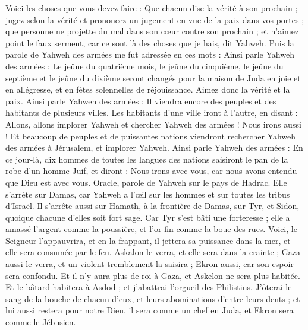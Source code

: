 \begin{multicols}{2}
Voici les choses que vous devez faire : Que chacun dise la vérité à son prochain ; jugez selon la vérité et prononcez un jugement en vue de la paix dans vos portes ;
que personne ne projette du mal dans son cœur contre son prochain ; et n'aimez point le faux serment, car ce sont là des choses que je hais, dit Yahweh.
Puis la parole de Yahweh des armées me fut adressée en ces mots :
Ainsi parle Yahweh des armées : Le jeûne du quatrième mois, le jeûne du cinquième, le jeûne du septième et le jeûne du dixième seront changés pour la maison de Juda en joie et en allégresse, et en fêtes solennelles de réjouissance. Aimez donc la vérité et la paix.
Ainsi parle Yahweh des armées : Il viendra encore des peuples et des habitants de plusieurs villes.
Les habitants d’une ville  iront à l'autre, en disant : Allons, allons implorer Yahweh et chercher Yahweh des armées ! Nous irons aussi !
Et beaucoup de peuples et de puissantes nations viendront rechercher Yahweh des armées à Jérusalem, et implorer Yahweh.
Ainsi parle Yahweh des armées : En ce jour-là, dix hommes de toutes les langues des nations saisiront le pan de la robe d'un homme Juif, et diront : Nous irons avec vous, car nous avons entendu que Dieu est avec vous.
\VerseOne{}Oracle, parole de Yahweh sur le pays de Hadrac. Elle s’arrête sur Damas, car Yahweh a l’œil sur les hommes et sur toutes les tribus d'Israël.
Il s’arrête aussi sur Hamath, à la frontière de Damas, sur Tyr, et Sidon, quoique chacune d'elles soit fort sage.
Car Tyr s'est bâti une forteresse ; elle a amassé l'argent comme la poussière, et l’or fin comme la boue des rues.
Voici, le Seigneur l'appauvrira, et en la frappant, il jettera sa puissance dans la mer, et elle sera consumée par le feu.
Askalon le verra, et elle sera dans la crainte ; Gaza aussi le verra, et un violent tremblement la saisira ; Ekron aussi, car son espoir sera confondu. Et il n'y aura plus de roi à Gaza, et Askelon ne sera plus habitée.
Et le bâtard habitera à Asdod ; et j’abattrai l'orgueil des Philistins.
J'ôterai le sang de la bouche de chacun d'eux, et leurs abominations d'entre leurs dents ; et lui aussi restera pour notre Dieu, il sera comme un chef en Juda, et Ekron sera comme le Jébusien.

\end{multicols}
